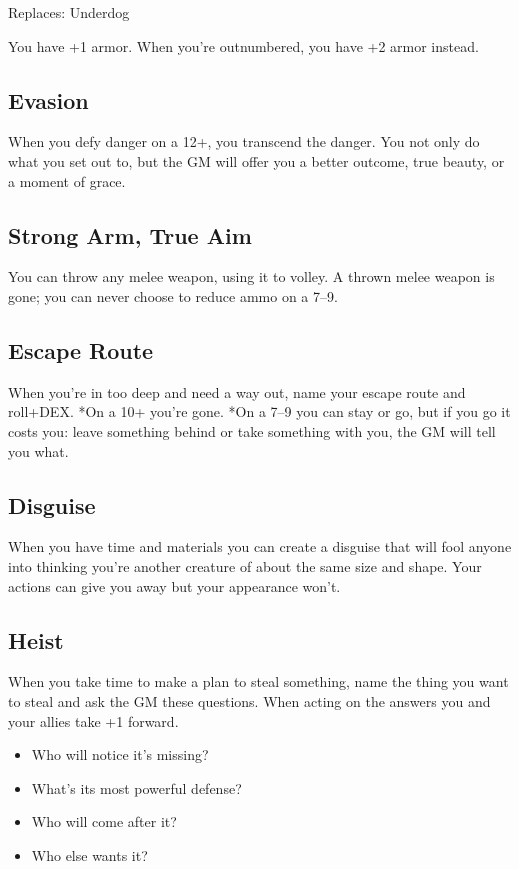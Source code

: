 Replaces: Underdog

You have +1 armor. When you're outnumbered, you have +2 armor instead.
\subsection{Evasion}

When you defy danger on a 12+, you transcend the danger. You not only do what you set out to, but the GM will offer you a better outcome, true beauty, or a moment of grace.
\subsection{Strong Arm, True Aim}

You can throw any melee weapon, using it to volley. A thrown melee weapon is gone; you can never choose to reduce ammo on a 7--9.
\subsection{Escape Route}

When you're in too deep and need a way out, name your escape route and roll+DEX. *On a 10+ you're gone. *On a 7--9 you can stay or go, but if you go it costs you: leave something behind or take something with you, the GM will tell you what.
\subsection{Disguise}

When you have time and materials you can create a disguise that will fool anyone into thinking you're another creature of about the same size and shape. Your actions can give you away but your appearance won't.
\subsection{Heist}

When you take time to make a plan to steal something, name the thing you want to steal and ask the GM these questions. When acting on the answers you and your allies take +1 forward.
\begin{itemize}
\item Who will notice it's missing?
\item What's its most powerful defense?
\item Who will come after it?
\item Who else wants it?

\end{itemize}


